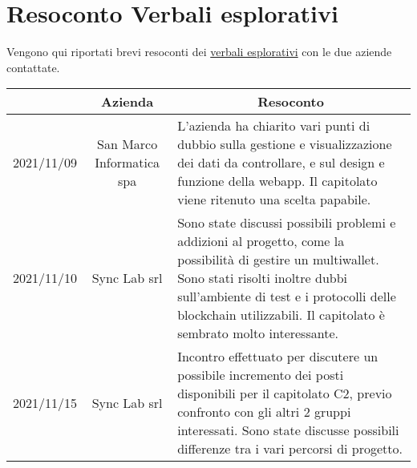 \section{Resoconto Verbali esplorativi}\label{section:resoconto_verbali}

Vengono qui riportati brevi resoconti dei \href{https://yakuzaishi-swe.github.io/docs/}{verbali esplorativi} con le due aziende contattate.

\begin{center}
	\renewcommand{\arraystretch}{1.8}
	\begin{longtable}[c]{c | c | p{5cm}}
		\rowcolor[HTML]{125E28}
		\multicolumn{1}{c}{\color[HTML]{FFFFFF} \textbf{Data}} & 
		\multicolumn{1}{c}{\color[HTML]{FFFFFF} \textbf{Azienda}} & 
		\multicolumn{1}{c}{\color[HTML]{FFFFFF} \textbf{Resoconto}} \\
		\endhead
		2021/11/09 & San Marco Informatica spa & L'azienda ha chiarito vari punti di dubbio sulla gestione e visualizzazione dei dati da controllare, e sul design e funzione della webapp. Il capitolato viene ritenuto una scelta papabile. \\
        2021/11/10 & Sync Lab srl & Sono state discussi possibili problemi e addizioni al progetto, come la possibilità di gestire un multiwallet. Sono stati risolti inoltre dubbi sull'ambiente di test e i protocolli delle blockchain utilizzabili. Il capitolato è sembrato molto interessante.\\
        2021/11/15 & Sync Lab srl & Incontro effettuato per discutere un possibile incremento dei posti disponibili per il capitolato C2, previo confronto con gli altri 2 gruppi interessati. Sono state discusse possibili differenze tra i vari percorsi di progetto. \\
	\end{longtable}
\end{center}